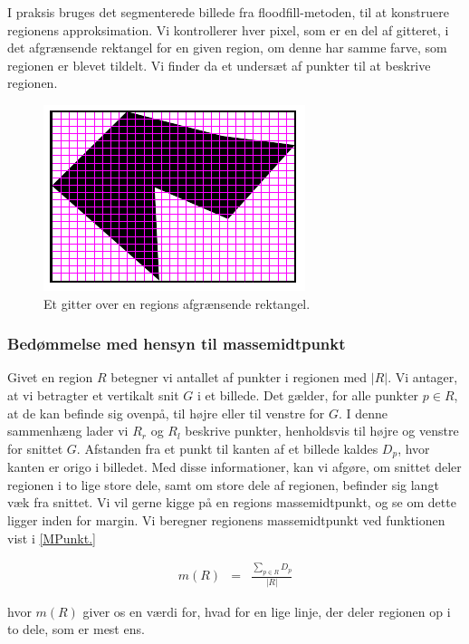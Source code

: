 {I praksis bruges det segmenterede billede fra floodfill-metoden, til at
konstruere regionens approksimation. Vi kontrollerer hver pixel, som er
en del af gitteret, i det afgrænsende rektangel for en given region, om
denne har samme farve, som regionen er blevet tildelt. Vi finder da et
undersæt af punkter til at beskrive regionen.

\begin{figure}[h]
    \centering
    \includegraphics[scale=0.76,angle=0]{afsnit/vores_implementation/billeder/udvidet_loesning/udvidetloesninglayer.png}
    \caption[]{Et gitter over en regions afgrænsende rektangel.}
    \label{grid}
\end{figure}

\subsubsection{Bedømmelse med hensyn til massemidtpunkt}
Givet en region $R$ betegner vi antallet af punkter i regionen med
$|R|$. Vi antager, at vi betragter et vertikalt snit $G$ i et billede.
Det gælder, for alle punkter $p \in R$, at de kan befinde sig ovenpå,
til højre eller til venstre for $G$. I denne sammenhæng lader vi $R_r$
og $R_l$ beskrive punkter, henholdsvis til højre og venstre for snittet
$G$.  Afstanden fra et punkt til kanten af et billede kaldes $D_p$, hvor
kanten er origo i billedet. Med disse informationer, kan vi afgøre, om
snittet deler regionen i to lige store dele, samt om store dele af
regionen, befinder sig langt væk fra snittet. Vi vil gerne kigge på en
regions massemidtpunkt, og se om dette ligger inden for margin. Vi
beregner regionens massemidtpunkt ved funktionen vist i \eqref{MPunkt.}

\begin{eqnarray}
    m(R) & = & \frac{\sum_{p \in R}{D_p}}{|R|} \label{masssemidpunkt}
    \label{MPunkt}
\end{eqnarray}

hvor $m(R)$ giver os en værdi for, hvad for en lige linje, der deler
regionen op i to dele, som er mest ens.

}
